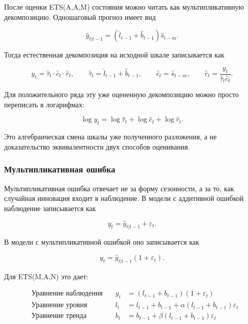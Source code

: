 \documentclass[12pt,fleqn]{article}
\begin{document}
После оценки ETS(A,A,M) состояния можно читать как мультипликативную декомпозицию.
Одношаговый прогноз имеет вид

\begin{equation}
  \hat y_{t|t-1}
  =
  (\hat l_{t-1}+\hat b_{t-1})
  \hat s_{t-m}.
\end{equation}

Тогда естественная декомпозиция на исходной шкале записывается как

\begin{equation}
  y_t
  =
  \hat\tau_t
  \cdot
  \hat c_t
  \cdot
  \hat r_t,
  \qquad
  \hat\tau_t=\hat l_{t-1}+\hat b_{t-1},
  \qquad
  \hat c_t=\hat s_{t-m},
  \qquad
  \hat r_t=\frac{y_t}{\hat\tau_t\hat c_t}.
\end{equation}

Для положительного ряда эту уже оцененную декомпозицию можно просто переписать в логарифмах:

\begin{equation}
  \log y_t
  =
  \log \hat\tau_t
  +\log \hat c_t
  +\log \hat r_t.
\end{equation}

Это алгебраическая смена шкалы уже полученного разложения, а не доказательство эквивалентности двух способов оценивания.

\subsubsection{Мультипликативная ошибка}

Мультипликативная ошибка отвечает не за форму сезонности, а за то, как случайная инновация входит в наблюдение.
В модели с аддитивной ошибкой наблюдение записывается как

\begin{equation}
  y_t
  =
  \hat y_{t|t-1}
  +\varepsilon_t.
\end{equation}

В модели с мультипликативной ошибкой оно записывается как

\begin{equation}
  y_t
  =
  \hat y_{t|t-1}(1+\varepsilon_t).
\end{equation}

Для ETS(M,A,N) это дает:

\begin{equation}
  \begin{array}{llll}
    &\text{Уравнение наблюдения} \quad &   y_t & = (l_{t-1} + b_{t-1})(1 + \varepsilon_t) \\
    &\text{Уравнение уровня}\quad & l_t & = l_{t-1} + b_{t-1} + \alpha (l_{t-1} + b_{t-1}) \varepsilon_t \\
    &\text{Уравнение тренда}\quad & b_t & = b_{t-1} + \beta (l_{t-1} + b_{t-1}) \varepsilon_t
  \end{array}
\end{equation}
\end{document}
